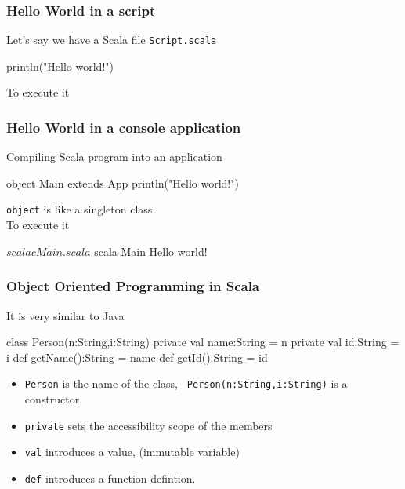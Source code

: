 \documentclass{beamer}
\newcommand{\beb}{\begin{exampleblock}}
\newcommand{\eeb}{\end{exampleblock}}
\begin{document}
\begin{frame}[fragile]
\frametitle{Hello World in a script}
Let's say we have a Scala file {\tt Script.scala}
\beb{}
\begin{code}
println("Hello world!")
\end{code}
\eeb
To execute it
\end{frame}

\begin{frame}[fragile]
\frametitle{Hello World in a console application}
Compiling Scala program into an application
\beb{}
\begin{code}
object Main extends App 
{
    println("Hello world!")
}
\end{code}
\eeb
{\tt object} is like a singleton class.  \\
To execute it
\begin{code}
$ scalac Main.scala
$ scala Main
Hello world!
\end{code}

\end{frame}

\begin{frame}[fragile]
\frametitle{Object Oriented Programming in Scala}
It is very similar to Java
\beb{}
\begin{code}
class Person(n:String,i:String) {
   private val name:String = n
   private val id:String   = i
   def getName():String = name
   def getId():String = id
}
\end{code}
\eeb
\begin{itemize}
 \item {\tt Person} is the name of the class, {\tt
     Person(n:String,i:String)} is a constructor.
 \item {\tt private} sets the accessibility scope of the members
 \item {\tt val} introduces a value, (immutable variable)
 \item {\tt def} introduces a function defintion.
\end{itemize}
\end{frame}
\end{document}

